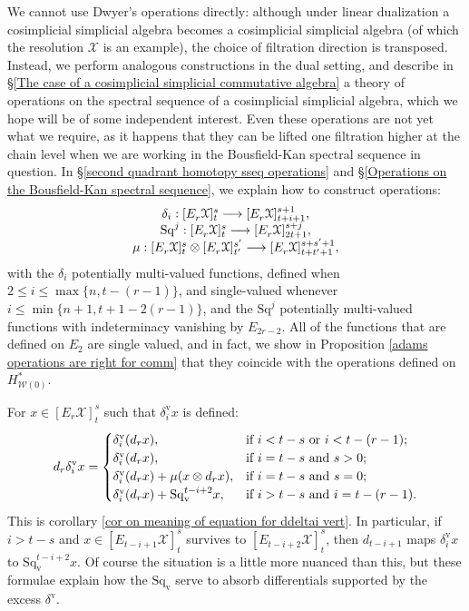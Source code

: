 \documentclass[11pt]{amsart} \renewcommand{\baselinestretch}{1.4}
\theoremstyle{plain}
\theoremstyle{definition}
\renewcommand{\to}{\longrightarrow}
\newcommand{\calw}{\mathcal{W}}
\newcommand{\calx}{\mathcal{X}}
\newcommand{\Sq}{\mathrm{Sq}}
\newcommand{\E}[5]{[E^{#1}_{#2}#3]^{#4}_{#5}}
\newcommand{\Edownup}[5]{[E_{#1}^{#2}#3]^{#4}_{#5}}
\newcommand{\uver}{^\mathrm{v}}
\newcommand{\dver}{_\mathrm{v}}
\newcommand{\Sqv}{\mathrm{Sq}\dver}
\newcommand{\deltav}{\delta\uver}
\begin{document}
\begin{Introduction}
We cannot use Dwyer's operations directly: although under linear dualization a cosimplicial simplicial algebra becomes a cosimplicial simplicial algebra (of which the resolution $\calx$ is an example), the choice of filtration direction is transposed. Instead, we perform analogous constructions in the dual setting, and describe in \S\ref{The case of a cosimplicial simplicial commutative algebra} a theory of operations on the spectral sequence of a cosimplicial simplicial algebra, which we hope will be of some independent interest. Even these operations are not yet what we require, as it happens that they can be lifted one filtration higher at the chain level when we are working in the Bousfield-Kan spectral sequence in question. In \S\ref{second quadrant homotopy sseq operations} and \S\ref{Operations on the Bousfield-Kan spectral sequence}, we explain how to construct operations:
\[\begin{tabular}{c}
$\delta_i:\Edownup{r}{}{\calx}{s}{t} \to \Edownup{r}{}{\calx}{s+1}{t+i+1}$,
\\
$\Sq^j:\Edownup{r}{}{\calx}{s}{t}   \to
\Edownup{r}{}{\calx}{s+j}{2t+1}$,\\
$\mu:\Edownup{r}{}{\calx}{s}{t}\otimes \Edownup{r}{}{\calx}{s'}{t'}\to
\Edownup{r}{}{\calx}{s+s'+1}{t+t'+1}$,
\end{tabular}\]
with the $\delta_i$ potentially multi-valued functions,  defined when $2\leq i\leq \max\{n,t-(r-1)\}$, and single-valued whenever $i\leq\min\{n+1,t+1-2(r-1)\}$, and the $\Sq^j$ potentially multi-valued functions with indeterminacy vanishing by $E_{2r-2}$. All of the functions that are  defined on $E_2$ are single valued, and in fact, we show in Proposition \ref{adams operations are right for comm} that they coincide with the operations defined on $H^*_{\calw(0)}$.

For $x\in \E{}{r}{\calx}{s}{t}$ such that  $\deltav_ix $ is defined:
\[d_r\deltav_ix=\begin{cases}
\deltav_i(d_rx),&\textup{if $i< t-s$ or $i<t-(r-1)$};\\
\deltav_i(d_rx),&\textup{if $i=t-s$ and $s>0$};\\
\deltav_i(d_rx)+\mu(x\otimes d_rx),&\textup{if $i=t-s$ and  $s=0$};\\
\deltav_i(d_rx)+\Sqv^{t-i+2}x,&\textup{if $i>t-s$ and $i=t-(r-1)$}.
\end{cases}\]
This is corollary \ref{cor on meaning of equation for ddeltai vert}. In particular, if $i>t-s$ and $x\in\E{}{t-i+1}{\calx}{s}{t}$ survives to $\E{}{t-i+2}{\calx}{s}{t}$, then $d_{t-i+1}$ maps $\deltav_ix$ to $\Sqv^{t-i+2}x$. Of course the situation is a little more nuanced than this, but these formulae explain how the $\Sqv$ serve to absorb differentials supported by the excess $\deltav$.


\end{Introduction}
\end{document}
